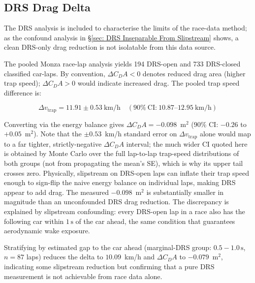 \subsection{DRS Drag Delta}
\label{sec: Results; DRS Drag Delta}

The DRS analysis is included to characterise the limits of the race-data method; as the confound analysis in \S\ref{sec: DRS Inseparable From Slipstream} shows, a clean DRS-only drag reduction is not isolatable from this data source.

The pooled Monza race-lap analysis yields 194 DRS-open and 733 DRS-closed classified car-laps. By convention, $\Delta C_DA < 0$ denotes reduced drag area (higher trap speed); $\Delta C_DA > 0$ would indicate increased drag. The pooled trap speed difference is:

\begin{equation}
    \Delta v_\text{trap} = 11.91 \pm 0.53~\text{km/h} \quad (90\%~\text{CI:}\ 10.87\text{--}12.95~\text{km/h})
\end{equation}

Converting via the energy balance gives $\Delta C_DA = -0.098$~m$^2$ ($90\%$ CI: $-0.26$ to $+0.05$~m$^2$). Note that the $\pm 0.53$~km/h standard error on $\Delta v_\text{trap}$ alone would map to a far tighter, strictly-negative $\Delta C_DA$ interval; the much wider CI quoted here is obtained by Monte Carlo over the full lap-to-lap trap-speed distributions of both groups (not from propagating the mean's SE), which is why its upper tail crosses zero. Physically, slipstream on DRS-open laps can inflate their trap speed enough to sign-flip the naive energy balance on individual laps, making DRS appear to add drag. The measured $-0.098$~m$^2$ is substantially smaller in magnitude than an unconfounded DRS drag reduction. The discrepancy is explained by slipstream confounding: every DRS-open lap in a race also has the following car within $1\,\text{s}$ of the car ahead, the same condition that guarantees aerodynamic wake exposure.

Stratifying by estimated gap to the car ahead (marginal-DRS group: $0.5-1.0\,\text{s}$, $n = 87$ laps) reduces the delta to $10.09$~km/h and $\Delta C_DA$ to $-0.079$~m$^2$, indicating some slipstream reduction but confirming that a pure DRS measurement is not achievable from race data alone.
